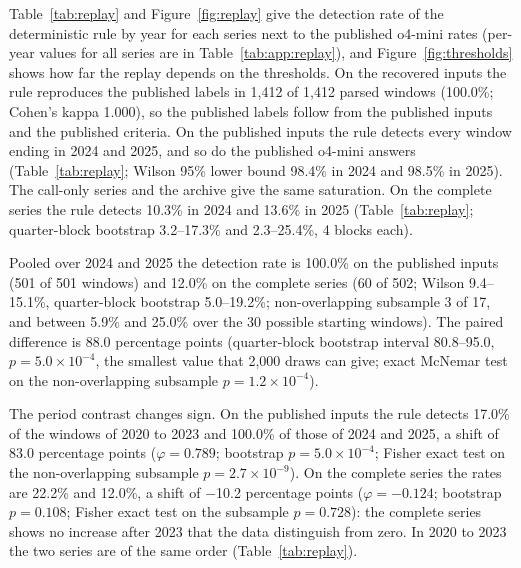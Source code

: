 Table~\ref{tab:replay} and Figure~\ref{fig:replay} give the detection rate of the deterministic rule by year for each series next to the published o4-mini rates (per-year values for all series are in Table~\ref{tab:app:replay}), and Figure~\ref{fig:thresholds} shows how far the replay depends on the thresholds.
On the recovered inputs the rule reproduces the published labels in 1{,}412 of 1{,}412 parsed windows (100.0\%; Cohen's kappa 1.000), so the published labels follow from the published inputs and the published criteria. On the published inputs the rule detects every window ending in 2024 and 2025, and so do the published o4-mini answers (Table~\ref{tab:replay}; Wilson 95\% lower bound 98.4\% in 2024 and 98.5\% in 2025). The call-only series and the archive give the same saturation. On the complete series the rule detects 10.3\% in 2024 and 13.6\% in 2025 (Table~\ref{tab:replay}; quarter-block bootstrap 3.2--17.3\% and 2.3--25.4\%, 4 blocks each).

Pooled over 2024 and 2025 the detection rate is 100.0\% on the published inputs (501 of 501 windows) and 12.0\% on the complete series (60 of 502; Wilson 9.4--15.1\%, quarter-block bootstrap 5.0--19.2\%; non-overlapping subsample 3 of 17, and between 5.9\% and 25.0\% over the 30 possible starting windows). The paired difference is 88.0 percentage points (quarter-block bootstrap interval 80.8--95.0, $p=5.0\times10^{-4}$, the smallest value that 2{,}000 draws can give; exact McNemar test on the non-overlapping subsample $p=1.2\times10^{-4}$).

The period contrast changes sign. On the published inputs the rule detects 17.0\% of the windows of 2020 to 2023 and 100.0\% of those of 2024 and 2025, a shift of 83.0 percentage points ($\varphi=0.789$; bootstrap $p=5.0\times10^{-4}$; Fisher exact test on the non-overlapping subsample $p=2.7\times10^{-9}$). On the complete series the rates are 22.2\% and 12.0\%, a shift of $-$10.2 percentage points ($\varphi=-0.124$; bootstrap $p=0.108$; Fisher exact test on the subsample $p=0.728$): the complete series shows no increase after 2023 that the data distinguish from zero. In 2020 to 2023 the two series are of the same order (Table~\ref{tab:replay}).

